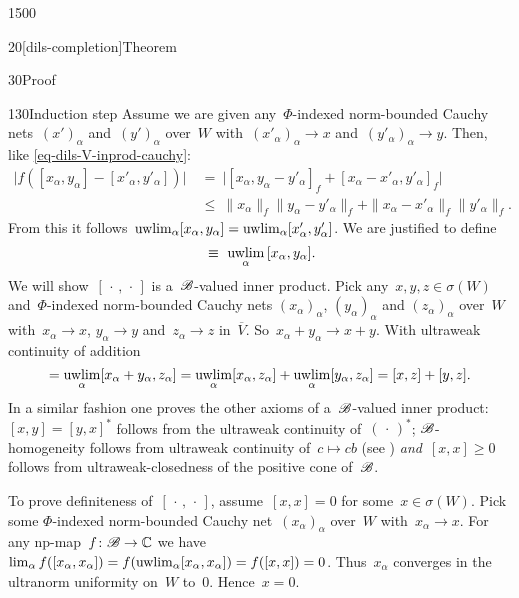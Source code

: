 \begin{parsec}{1500}
\begin{point}{20}[dils-completion]{Theorem}
\begin{point}{30}{Proof}
\begin{point}{130}{Induction step}
Assume we are given any~$\Phi$-indexed
norm-bounded Cauchy nets~$(x')_\alpha$ and~$(y')_\alpha$ over~$W$
with~$ (x'_\alpha)_\alpha \to x$
and~$ (y'_\alpha)_\alpha \to y$.
Then, like \eqref{eq-dils-V-inprod-cauchy}:
\begin{align*}
    \bigl|f([x_\alpha, y_\alpha] - [x'_\alpha,y'_\alpha])\bigr|
    & \ =\  \bigl| [x_\alpha, y_\alpha - y'_\alpha]_f
        + [x_\alpha - x'_\alpha, y'_\alpha]_f\bigr| \\
    &\  \leq\  \|x_\alpha\|_f \|y_\alpha - y'_\alpha\|_f
        + \|x_\alpha - x'_\alpha\|_f \| y'_\alpha \|_f.
\end{align*}
From this it follows~$ \uwlim_\alpha [x_\alpha,y_\alpha]=
    \uwlim_\alpha [x'_\alpha,y'_\alpha]$.
We are justified to define
\begin{equation*}
    [x,y] \ \equiv\  \uwlim_{\alpha} \,[x_\alpha,y_\alpha].
\end{equation*}
We will show~$[\,\cdot\,,\,\cdot\,]$ is a~$\mathscr{B}$-valued inner product.
Pick any~$x,y,z \in \sigma(W)$
    and~$\Phi$-indexed
norm-bounded Cauchy nets
$(x_\alpha)_\alpha$, $(y_\alpha)_\alpha$ and $(z_\alpha)_\alpha$ over~$W$
with~$x_\alpha \to x$, $y_\alpha \to y$ and~$z_\alpha \to z$ in~$\overline{V}$.
So~$x_\alpha+ y_\alpha \to x + y.$
With ultraweak continuity of addition
\begin{equation*}
    [x+y,z] = \uwlim_\alpha [x_\alpha +y_\alpha, z_\alpha]
        = \uwlim_\alpha [x_\alpha, z_\alpha] +
                \uwlim_\alpha [y_\alpha, z_\alpha]
                = [x,z] + [y,z].
\end{equation*}
In a similar fashion one proves the other axioms of
    a~$\mathscr{B}$-valued inner product:
    $[x,y]=[y,x]^*$ follows from the ultraweak continuity of~$(\,\cdot\,)^*$;
    $\mathscr{B}$-homogeneity follows from
        ultraweak continuity of~$c \mapsto cb$ (see )
        \emph{and}~$[x,x]\geq 0$ follows from ultraweak-closedness of the
        positive cone of~$\mathscr{B}$.

        To prove definiteness of~$[\,\cdot\,,\,\cdot\,]$, assume~$[x,x]=0$
            for some~$x \in \sigma(W)$.
    Pick some $\Phi$-indexed norm-bounded
        Cauchy net~$(x_\alpha)_\alpha$ over~$W$
        with~$x_\alpha \to x$.
For any np-map~$f\colon \mathscr{B} \to \mathbb{C}$
we have~$\lim_\alpha f([x_\alpha,x_\alpha])
         = f(\uwlim_\alpha [x_\alpha,x_\alpha])
         = f([x,x])  =  0$.
Thus~$x_\alpha$ converges in the ultranorm uniformity on~$W$ to~$0$.
Hence~$x=0$.


\end{point}
\end{point}
\end{point}
\end{parsec}
